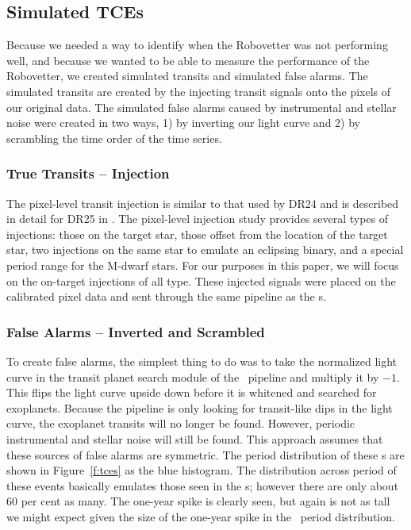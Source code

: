 \subsection{Simulated TCEs}
\label{s:simulated}
Because we needed a way to identify when the Robovetter was not performing well, and because we wanted to be able to measure the performance of the Robovetter, we created simulated transits and simulated false alarms. The simulated transits are created by the injecting transit signals onto the pixels of our original data.  The simulated false alarms caused by instrumental and stellar noise were created in two ways, 1) by inverting our light curve and 2) by scrambling the time order of the time series.  


\subsubsection{True Transits -- Injection}
\label{injectsec}
The pixel-level transit injection is similar to that used by DR24 \citep{Christiansen2016} and is described in detail for DR25 in \citep{Christiansen2017}. The pixel-level injection study provides several types of injections: those on the target star, those offset from the location of the target star, two injections on the same star to emulate an eclipsing binary, and a special period range for the M-dwarf stars.  For our purposes in this paper, we will focus on the on-target injections of all type.  These injected signals were placed on the calibrated pixel data and sent through the same \Kepler{} pipeline as the \opstce s.


\subsubsection{False Alarms -- Inverted and Scrambled} 

To create false alarms, the simplest thing to do was to take the normalized light curve in the transit planet search module of the \Kepler\ pipeline and multiply it by $-1$.  This flips the light curve upside down before it is whitened and searched for exoplanets.  Because the pipeline is only looking for transit-like dips in the light curve, the exoplanet transits will no longer be found. However, periodic instrumental and stellar noise will still be found.  This approach assumes that these sources of false alarms are symmetric. The period distribution of these \invtce s are shown in Figure~\ref{f:tces} as the blue histogram.  The distribution across period of these events basically emulates those seen in the \opstce s; however there are only about 60 per cent as many.  The one-year spike is clearly seen, but again is not as tall we might expect given the size of the one-year spike in the \opstce\ period distribution. 

